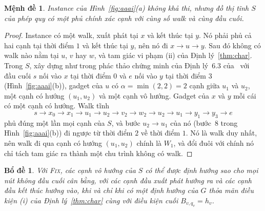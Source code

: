\documentclass[pdflatex,sn-mathphys-num]{sn-jnl}
\theoremstyle{thmstyleone}%
\newtheorem{lemma}[theorem]{Bổ đề}%
\newtheorem{proposition}[theorem]{Mệnh đề}%
\theoremstyle{thmstyletwo}%
\theoremstyle{thmstylethree}%
\newcommand{\FIX}{\textup{\textsc{Fix}}}
\begin{document}
\begin{proposition}\label{prop:aaai}
Instance của Hình~\ref{fig:aaai}(a) không khả thi, nhưng đồ thị tĩnh $S$ của phép quy có một phủ chính xác cạnh với cùng số walk và cùng đầu cuối.
\end{proposition}


\begin{proof}
Instance có một walk, xuất phát tại $x$ và kết thúc tại $y$. Nó phải phủ cả hai cạnh tại thời điểm $1$ và kết thúc tại $y$, nên nó đi $x\to u\to y$. Sau đó không có walk nào nằm tại $u$, $v$ hay $w$, và tam giác vi phạm (ii) của Định lý~\ref{thm:char}. Trong $S$, xây dựng như trong phác thảo chứng minh của Định lý~6.3 của~\cite{deligkas2025} với đầu cuối $s$ nối vào $x$ tại thời điểm $0$ và $e$ nối vào $y$ tại thời điểm $3$ (Hình~\ref{fig:aaai}(b)), gadget của $u$ có $\alpha=\min(2,2)=2$ cạnh giữa $u_1$ và $u_2$, một cạnh có hướng $(u_1,u_2)$ và một cạnh vô hướng. Gadget của $x$ và $y$ mỗi cái có một cạnh có hướng. Walk tĩnh
\[
  s\to x_0\to x_1\to u_1\to u_2\to v_2\to w_2\to u_2\to u_1\to y_1\to y_3\to e
\]
phủ đúng một lần mọi cạnh của $S$, và bước $u_2\to u_1$ của nó (bước~8 trong Hình~\ref{fig:aaai}(b)) đi ngược từ thời điểm $2$ về thời điểm $1$. Nó là walk duy nhất, nên walk đi qua cạnh có hướng $(u_1,u_2)$ chính là $W_1$, và đổi đuôi với chính nó chỉ tách tam giác ra thành một chu trình không có walk.
\end{proof}


\begin{lemma}\label{lem:aaai}
Với \FIX{}, các cạnh vô hướng của $S$ có thể được định hướng sao cho mọi nút không đầu cuối cân bằng, với các cạnh đầu xuất phát hướng ra và các cạnh đầu kết thúc hướng vào, khi và chỉ khi có một định hướng của $G$ thỏa mãn điều kiện (i) của Định lý~\ref{thm:char} cùng với điều kiện cuối $B_{v,q_v}=h_v$.
\end{lemma}
\end{document}
